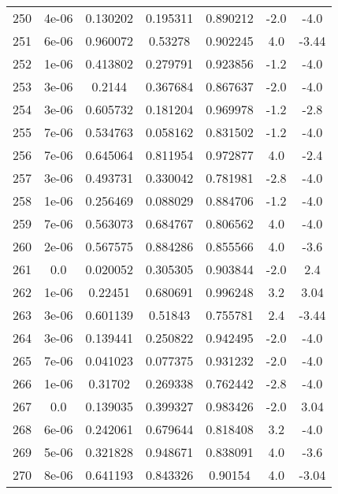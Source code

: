 \begin{table}
\begin{tabular}{c|c|c|c|c|c|c}
250 & 4e-06 & 0.130202 & 0.195311 & 0.890212 & -2.0 & -4.0\\
251 & 6e-06 & 0.960072 & 0.53278 & 0.902245 & 4.0 & -3.44\\
252 & 1e-06 & 0.413802 & 0.279791 & 0.923856 & -1.2 & -4.0\\
253 & 3e-06 & 0.2144 & 0.367684 & 0.867637 & -2.0 & -4.0\\
254 & 3e-06 & 0.605732 & 0.181204 & 0.969978 & -1.2 & -2.8\\
255 & 7e-06 & 0.534763 & 0.058162 & 0.831502 & -1.2 & -4.0\\
256 & 7e-06 & 0.645064 & 0.811954 & 0.972877 & 4.0 & -2.4\\
257 & 3e-06 & 0.493731 & 0.330042 & 0.781981 & -2.8 & -4.0\\
258 & 1e-06 & 0.256469 & 0.088029 & 0.884706 & -1.2 & -4.0\\
259 & 7e-06 & 0.563073 & 0.684767 & 0.806562 & 4.0 & -4.0\\
260 & 2e-06 & 0.567575 & 0.884286 & 0.855566 & 4.0 & -3.6\\
261 & 0.0 & 0.020052 & 0.305305 & 0.903844 & -2.0 & 2.4\\
262 & 1e-06 & 0.22451 & 0.680691 & 0.996248 & 3.2 & 3.04\\
263 & 3e-06 & 0.601139 & 0.51843 & 0.755781 & 2.4 & -3.44\\
264 & 3e-06 & 0.139441 & 0.250822 & 0.942495 & -2.0 & -4.0\\
265 & 7e-06 & 0.041023 & 0.077375 & 0.931232 & -2.0 & -4.0\\
266 & 1e-06 & 0.31702 & 0.269338 & 0.762442 & -2.8 & -4.0\\
267 & 0.0 & 0.139035 & 0.399327 & 0.983426 & -2.0 & 3.04\\
268 & 6e-06 & 0.242061 & 0.679644 & 0.818408 & 3.2 & -4.0\\
269 & 5e-06 & 0.321828 & 0.948671 & 0.838091 & 4.0 & -3.6\\
270 & 8e-06 & 0.641193 & 0.843326 & 0.90154 & 4.0 & -3.04\\
\end{tabular}
\end{table}
\newpage

